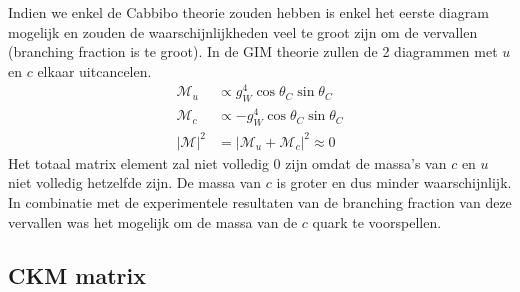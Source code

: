 \documentclass[../main.tex]{subfiles}
\begin{document}
Indien we enkel de Cabbibo theorie zouden hebben is enkel het eerste diagram mogelijk en zouden de waarschijnlijkheden veel te groot zijn om de vervallen (branching fraction is te groot). In de GIM theorie zullen de 2 diagrammen met $u$ en $c$ elkaar uitcancelen.
\begin{equation}
    \begin{aligned}
        \label{eq:fcnc_mat_el}
        \mathcal{M}_{u} &\propto g_{W}^{4} \cos \theta_{C} \sin \theta_{C}\\
        \mathcal{M}_{c} &\propto-g_{W}^{4} \cos \theta_{C} \sin \theta_{C}\\
        |\mathcal{M}|^{2}&=\left|\mathcal{M}_{u}+\mathcal{M}_{c}\right|^{2} \approx 0
    \end{aligned}
\end{equation}
Het totaal matrix element zal niet volledig 0 zijn omdat de massa's van $c$ en $u$ niet volledig hetzelfde zijn. De massa van $c$ is groter en dus minder waarschijnlijk. In combinatie met de experimentele resultaten van de branching fraction van deze vervallen was het mogelijk om de massa van de $c$ quark te voorspellen.

\subsection{CKM matrix}%
\label{sub:ckm_matrix}
\end{document}
